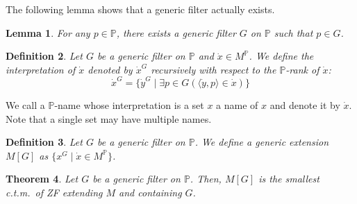 \documentclass{report}
\newtheorem{thm}{Theorem}[section]
\newtheorem{lem}[thm]{Lemma}
\newtheorem{dfn}[thm]{Definition}
\begin{document}
The following lemma shows that a generic filter actually exists.
\begin{lem} 
  For any $p \in \mathbb{P}$, there exists a generic filter $G$ on $\mathbb{P}$ such that $p \in G$.
\end{lem}

\begin{dfn} 
  Let $G$ be a generic filter on $\mathbb{P}$ and $\dot{x} \in M^{\mathbb{P}}$. We define the \emph{interpretation} of $\dot{x}$ denoted by $\dot{x}^G$ recursively with respect to the $\mathbb{P}$-rank of $\dot{x}$:
  $$\dot{x}^G = \{\dot{y}^G \mid \exists p \in G (\langle \dot{y}, p \rangle \in \dot{x})\}$$ 
\end{dfn}

We call a $\mathbb{P}$-name whose interpretation is a set $x$ a name of $x$ and denote it by $\dot{x}$.
Note that a single set may have multiple names.

\begin{dfn} 
  Let $G$ be a generic filter on $\mathbb{P}$. We define a \emph{generic extension} $M[G]$ as $\{x^G \mid \dot{x} \in M^{\mathbb{P}}\}$.
\end{dfn}

\begin{thm} 
  Let $G$ be a generic filter on $\mathbb{P}$. Then, $M[G]$ is the smallest c.t.m.\  of ZF extending $M$ and containing $G$.
\end{thm}
\end{document}
